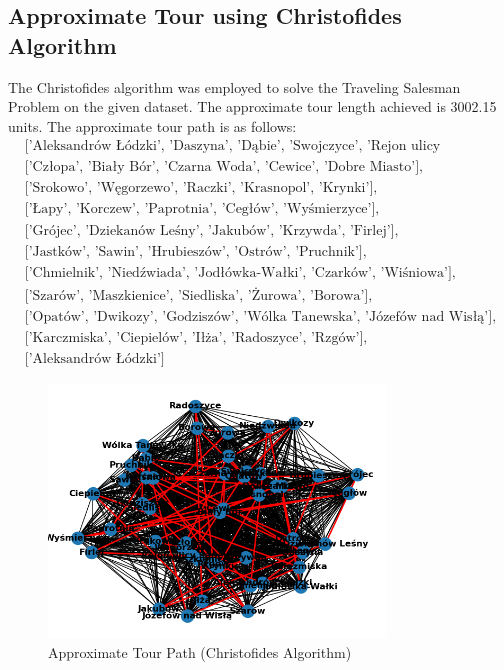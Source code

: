 \subsection*{Approximate Tour using Christofides Algorithm}

The Christofides algorithm was employed to solve the Traveling Salesman Problem on the given dataset. The approximate tour length achieved is 3002.15 units.\newline
The approximate tour path is as follows:
\[
\begin{aligned}
&\text{['Aleksandrów Łódzki', 'Daszyna', 'Dąbie', 'Swojczyce', 'Rejon ulicy Saperów'],} \\
&\text{['Człopa', 'Biały Bór', 'Czarna Woda', 'Cewice', 'Dobre Miasto'],} \\
&\text{['Srokowo', 'Węgorzewo', 'Raczki', 'Krasnopol', 'Krynki'],} \\
&\text{['Łapy', 'Korczew', 'Paprotnia', 'Cegłów', 'Wyśmierzyce'],} \\
&\text{['Grójec', 'Dziekanów Leśny', 'Jakubów', 'Krzywda', 'Firlej'],} \\
&\text{['Jastków', 'Sawin', 'Hrubieszów', 'Ostrów', 'Pruchnik'],} \\
&\text{['Chmielnik', 'Niedźwiada', 'Jodłówka-Wałki', 'Czarków', 'Wiśniowa'],} \\
&\text{['Szarów', 'Maszkienice', 'Siedliska', 'Żurowa', 'Borowa'],} \\
&\text{['Opatów', 'Dwikozy', 'Godziszów', 'Wólka Tanewska', 'Józefów nad Wisłą'],} \\
&\text{['Karczmiska', 'Ciepielów', 'Iłża', 'Radoszyce', 'Rzgów'],} \\
&\text{['Aleksandrów Łódzki']}
\end{aligned}
\]
\begin{figure}[H]
    \centering
    \includegraphics[width=0.8\textwidth]{Chapters/christofides_plot.png}
    \caption{Approximate Tour Path (Christofides Algorithm)}
    \label{fig:christofides_tour}
\end{figure}
\newpage
